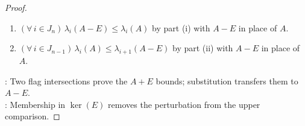 \begin{theorem}
\begin{proof}
\begin{enumerate}[label=(\roman*)]
Fix a unit $\mathbf{x}\in\mathcal{U}\cap\mathcal{V}\cap\mathcal{W}$ by Corollary \ref{cor:large-subspaces-intersect}(i) and normalization.\\
The chain $\lambda_i(A+E)\leq\mathbf{x}^*(A+E)\mathbf{x}=\mathbf{x}^*A\mathbf{x}\leq\lambda_{i+1}(A)$ holds by Theorem \ref{thm:rayleigh-quotient-spectral-interval}.
\item $(\forall\,i\in J_n)\,\lambda_i(A-E)\leq\lambda_i(A)$ by part (i) with $A-E$ in place of $A$.
\item $(\forall\,i\in J_{n-1})\,\lambda_i(A)\leq\lambda_{i+1}(A-E)$ by part (ii) with $A-E$ in place of $A$.
\end{enumerate}
: Two flag intersections prove the $A+E$ bounds; substitution transfers them to $A-E$.\\
: Membership in $\ker(E)$ removes the perturbation from the upper comparison.
\end{proof}
\end{theorem}

